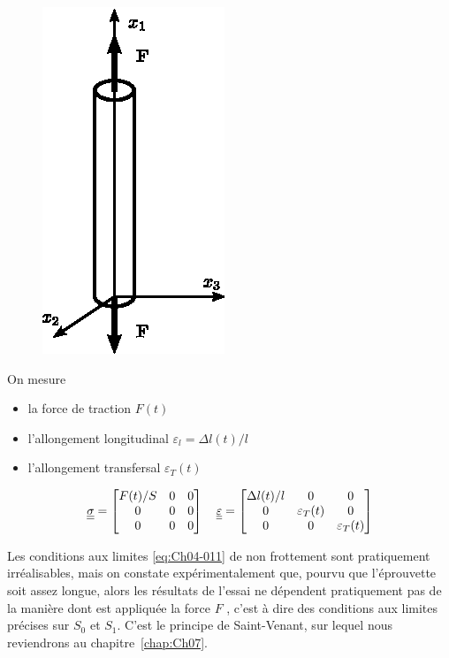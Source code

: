 \begin{figure}
    \begin{center}
        \includegraphics{../images/T1_Ch04-0007}
    \end{center}
\end{figure}
On mesure 
\begin{itemize}
    \item la force de traction $F(t)$
    \item l'allongement longitudinal $\varepsilon_{l} = \Delta l(t)/l$
    \item l'allongement transfersal $\varepsilon_T(t)$
\end{itemize}
\begin{equation}
    \underline{\underline{\sigma}} =
    \begin{bmatrix}
        F(t)/S & 0 & 0 \\
        0 & 0 & 0 \\
        0 & 0 & 0
    \end{bmatrix}
    \quad
    \underline{\underline{\varepsilon}} = 
    \begin{bmatrix}
        \Delta l(t)/l & 0 & 0 \\
        0 & \varepsilon_T(t) & 0 \\
        0 & 0 & \varepsilon_T(t)
    \end{bmatrix}
    \label{eq:Ch04-035}
\end{equation}

Les conditions aux limites \eqref{eq:Ch04-011} de non frottement sont pratiquement irréalisables, mais on constate expérimentalement que, pourvu que l'éprouvette soit assez longue, alors les résultats de l'essai ne dépendent pratiquement pas de la manière dont est appliquée la force $F$ , c'est à dire des conditions aux limites précises sur $S_0$ et $S_1$.
C'est le principe de Saint-Venant, sur lequel nous reviendrons au chapitre~\ref{chap:Ch07}.

